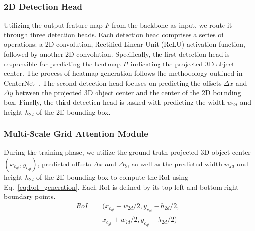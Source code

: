 \documentclass[journal]{IEEEtran}
\begin{document}
	\subsubsection{2D Detection Head}\label{2d_detection_head}
	Utilizing the output feature map $F$ from the backbone as input, we route it through three detection heads. Each detection head comprises a series of operations: a 2D convolution, Rectified Linear Unit (ReLU) activation function, followed by another 2D convolution. Specifically, the first detection head is responsible for predicting the heatmap $H$ indicating the projected 3D object center. The process of heatmap generation follows the methodology outlined in CenterNet~\cite{centernet}. The second detection head focuses on predicting the offsets $\Delta x$ and $\Delta y$ between the projected 3D object center and the center of the 2D bounding box. Finally, the third detection head is tasked with predicting the width $w_{2d}$ and height $h_{2d}$ of the 2D bounding box.
	
	\subsubsection{Multi-Scale Grid Attention Module}\label{msga}
	During the training phase, we utilize the ground truth projected 3D object center $(x_{c_{gt}}, y_{c_{gt}})$, predicted offsets $\Delta x$ and $\Delta y$, as well as the predicted width $w_{2d}$ and height $h_{2d}$ of the 2D bounding box to compute the RoI using Eq.~\eqref{eq:RoI_generation}. Each RoI is defined by its top-left and bottom-right boundary points.
	\begin{equation}
	\begin{aligned}
	RoI =& (x_{c_{gt}}-w_{2d}/2, y_{c_{gt}}-h_{2d}/2, \\
  &x_{c_{gt}}+w_{2d}/2, y_{c_{gt}}+h_{2d}/2)
	\label{eq:RoI_generation}
	\end{aligned}
	\end{equation}
\end{document}
